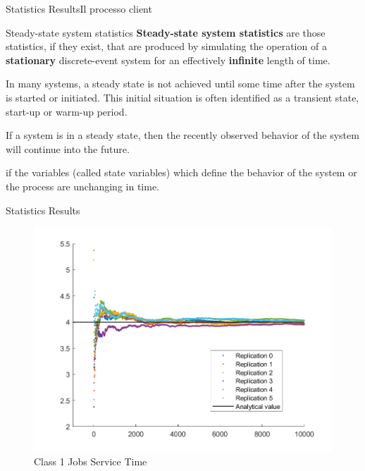 \documentclass[10pt]{beamer}
\begin{document}
\begin{frame}[fragile]{Statistics Results}{Il processo client}

\begin{block}{Steady-state system statistics}
\textbf{Steady-state system statistics} are those statistics, if they exist, that are produced by simulating the operation of a \textbf{stationary} discrete-event system for an effectively \textbf{infinite} length of time.

In many systems, a steady state is not achieved until some time after the system is started or initiated. This initial situation is often identified as a transient state, start-up or warm-up period.

If a system is in a steady state, then the recently observed behavior of the system will continue into the future.

if the variables (called state variables) which define the behavior of the system or the process are unchanging in time.

\end{block}
\end{frame}

\begin{frame}[fragile]{Statistics Results}{}

\begin{figure}
\centering
\includegraphics[width=\textwidth]{./images/ScatterPlotCloud_Class1JobsServiceTime.png}
\caption{Class 1 Jobs Service Time}
\label{fig:Concorrente}
\end{figure}


\end{frame}
\end{document}
